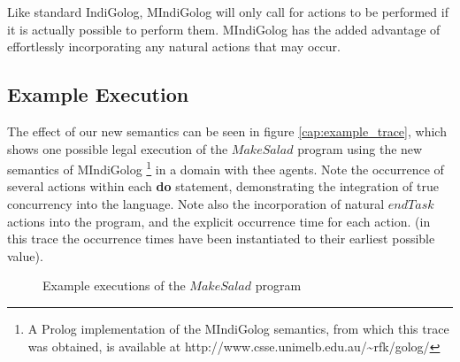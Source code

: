 Like standard IndiGolog, MIndiGolog will only call for actions to
be performed if it is actually possible to perform them. MIndiGolog
has the added advantage of effortlessly incorporating any natural
actions that may occur.


\subsection{Example Execution}

The effect of our new semantics can be seen in figure \ref{cap:example_trace},
which shows one possible legal execution of the $MakeSalad$ program
using the new semantics of MIndiGolog%
\footnote{A Prolog implementation of the MIndiGolog semantics, from which this
trace was obtained, is available at http://www.csse.unimelb.edu.au/\textasciitilde{}rfk/golog/%
} in a domain with thee agents. Note the occurrence of several actions
within each \textbf{do} statement, demonstrating the integration of
true concurrency into the language. Note also the incorporation of
natural $endTask$ actions into the program, and the explicit occurrence
time for each action. (in this trace the occurrence times have been
instantiated to their earliest possible value).

%
\begin{figure*}[t]
\centering {}  

\caption{Example executions of the $MakeSalad$ program}

\end{figure*}


